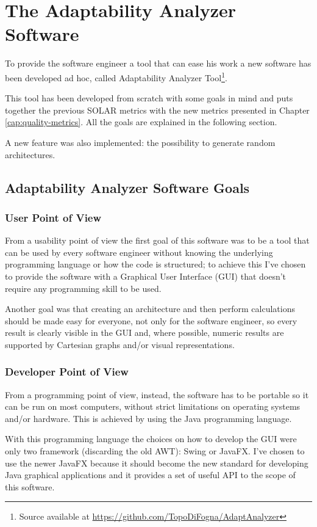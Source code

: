 \chapter{The Adaptability Analyzer Software}
\label{cap:design}

To provide the software engineer a tool that can ease his work a new software has been developed ad hoc, called Adaptability Analyzer Tool\footnote{Source available at \url{https://github.com/TopoDiFogna/AdaptAnalyzer}}.

This tool has been developed from scratch with some goals in mind and puts together the previous SOLAR\cite{solar} metrics with the new metrics presented in Chapter \ref{cap:quality-metrics}. All the goals are explained in the following section.

A new feature was also implemented: the possibility to generate random architectures.

\section{Adaptability Analyzer Software Goals}
\subsection{User Point of View}
From a usability point of view the first goal of this software was to be a tool that can be used by every software engineer without knowing the underlying programming language or how the code is structured; to achieve this I've chosen to provide the software with a Graphical User Interface (GUI) that doesn't require any programming skill to be used.

Another goal was that creating an architecture and then perform calculations should be made easy for everyone, not only for the software engineer, so every result is clearly visible in the GUI and, where possible, numeric results are supported by Cartesian graphs and/or visual representations.

\subsection{Developer Point of View}
From a programming point of view, instead, the software has to be portable so it can be run on most computers, without strict limitations on operating systems and/or hardware. This is achieved by using the Java programming language\cite{java-se}. 

With this programming language the choices on how to develop the GUI were only two framework (discarding the old AWT\cite{awt}): Swing\cite{swing} or JavaFX\cite{javafx}. I've chosen to use the newer JavaFX because it should become the new standard for developing Java graphical applications and it provides a set of useful API to the scope of this software.

